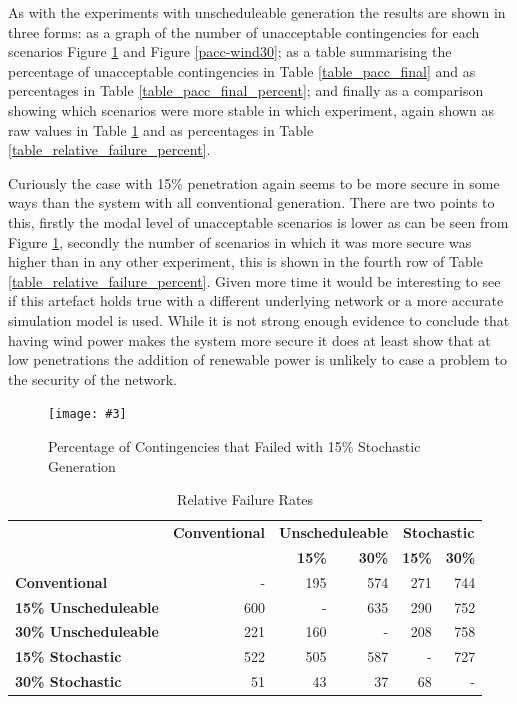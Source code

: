 \documentclass[a4paper,oneside,12pt]{report}
\newcommand{\image}[3] {
  \begin{figure}
    \begin{center}
      \texttt{[image: \#3]}
      \caption{#2}
      \label{#1}
    \end{center}
  \end{figure}
}
\begin{document}
As with the experiments with unscheduleable generation the results are shown in three forms: as a graph of the number of unacceptable contingencies for each scenarios Figure \ref{pacc-wind15} and Figure \ref{pacc-wind30}; as a table summarising the percentage of unacceptable contingencies in Table \ref{table_pacc_final} and as percentages in Table \ref{table_pacc_final_percent}; and finally as a comparison showing which scenarios were more stable in which experiment, again shown as raw values in Table \ref{table_relative_failure} and as percentages in Table \ref{table_relative_failure_percent}.

Curiously the case with 15\% penetration again seems to be more secure in some ways than the system with all conventional generation. There are two points to this, firstly the modal level of unacceptable scenarios is lower as can be seen from Figure \ref{pacc-wind15}, secondly the number of scenarios in which it was more secure was higher than in any other experiment, this is shown in the fourth row of Table \ref{table_relative_failure_percent}. Given more time it would be interesting to see if this artefact holds true with a different underlying network or a more accurate simulation model is used. While it is not strong enough evidence to conclude that having wind power makes the system more secure it does at least show that at low penetrations the addition of renewable power is unlikely to case a problem to the security of the network.

\image{pacc-wind15}{Percentage of Contingencies that Failed with 15\% Stochastic Generation}{pacc-wind15.png}

\begin{table}[htbp]
\caption{Relative Failure Rates}
\begin{tabular}{l|r|r|r|r|r}
\bfseries & \bfseries Conventional & \multicolumn{2}{c|}{ \bfseries Unscheduleable} & \multicolumn{2}{c}{ \bfseries Stochastic} \\
\bfseries & \bfseries & \bfseries 15\% & \bfseries 30\% & \bfseries 15\% & \bfseries 30\% \\
\hline \hline
\bfseries Conventional & - & 195 & 574 & 271 & 744 \\ 
\bfseries 15\% Unscheduleable & 600 & - & 635 & 290 & 752 \\
\bfseries 30\% Unscheduleable & 221 & 160 & - & 208 & 758 \\ 
\bfseries 15\% Stochastic & 522 & 505 & 587 & - & 727 \\ 
\bfseries 30\% Stochastic & 51 & 43 & 37 & 68 & - \\ 
\hline
\end{tabular}
\label{table_relative_failure}
\end{table}
\end{document}
